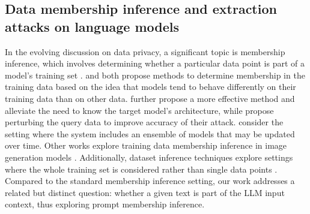 \subsection{Data membership inference and extraction attacks on language models}

In the evolving discussion on data privacy, a significant topic is membership inference, which involves determining whether a particular data point is part of a model's training set \citep[e.g.][]{yeom2018privacy, sablayrolles2019white, salem2018ml, song2021systematic, hu2022membership}. 
\citet{shokri2017membership} and \citet{carlini2022membership} both propose methods to determine membership in the training data based on the idea that models tend to behave differently on their training data than on other data. \citet{bertran2024scalable} further propose a more effective method and alleviate the need to know the target model's architecture, while \citet{wen2022canary} propose perturbing the query data to improve accuracy of their attack. 
\citet{jagielski2023combine} consider the setting where the system includes an ensemble of models that may be updated over time. Other works explore training data membership inference in image generation models \citep{duan2023diffusion, matsumoto2023membership}. Additionally, dataset inference techniques explore settings where the whole training set is considered rather than single data points \citep{maini2021dataset, maini2024llm}.
Compared to the standard membership inference setting, our work addresses a related but distinct question: whether a given text is part of the LLM input context, thus exploring prompt membership inference. 
